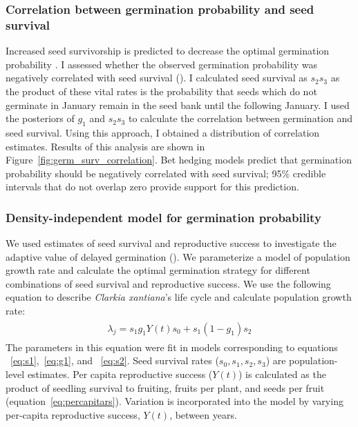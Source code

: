 \documentclass[12pt, oneside, titlepage]{article}   	%
\begin{document}
\subsubsection*{Correlation between germination probability and seed survival}

Increased seed survivorship is predicted to decrease the optimal germination probability \cite{cohen1966,ellner1985a}. I assessed whether the observed germination probability was negatively correlated with seed survival (\cite{gremer2014}). I calculated seed survival as $s_2 s_3$ as the product of these vital rates is the probability that seeds which do not germinate in January remain in the seed bank until the following January. I used the posteriors of $g_1$ and $s_2 s_3$ to calculate the correlation between germination and seed survival. Using this approach, I obtained a distribution of correlation estimates. Results of this analysis are shown in Figure~\ref{fig:germ_surv_correlation}. Bet hedging models predict that germination probability should be negatively correlated with seed survival; 95\% credible intervals that do not overlap zero provide support for this prediction.

\subsubsection*{Density-independent model for germination probability}

We used estimates of seed survival and reproductive success to investigate the adaptive value of delayed germination (\cite{gremer2014}). We parameterize a model of population growth rate and calculate the optimal germination strategy for different combinations of seed survival and reproductive success. We use the following equation to describe \textit{Clarkia xantiana}'s life cycle and calculate population growth rate:
%
\begin{align}
  \begin{split}
\lambda_{j} = s_1 g_1 Y(t) s_0 + s_1 (1-g_1) s_2
  \end{split}
\end{align}
%
The parameters in this equation were fit in models corresponding to equations ~\eqref{eq:s1},~\eqref{eq:g1}, and ~\eqref{eq:s2}. Seed survival rates ($s_0, s_1, s_2, s_3$) are population-level estimates. Per capita reproductive success ($Y(t)$) is calculated as the product of seedling survival to fruiting, fruits per plant, and seeds per fruit (equation~\eqref{eq:percapitars}). Variation is incorporated into the model by varying per-capita reproductive success, $Y(t)$, between years.
\end{document}
